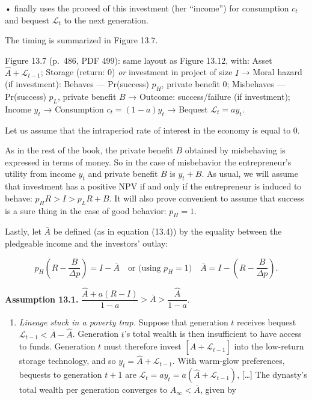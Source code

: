 \documentclass[11pt,a4paper]{article}
\providecommand{\tightlist}{\setlength{\itemsep}{0pt}\setlength{\parskip}{0pt}}
\begin{document}
• finally uses the proceed of this investment (her ``income'') for consumption \(c_t\) and bequest
\(\mathcal{L}_t\) to the next generation.

The timing is summarized in Figure 13.7.

Figure 13.7 (p.~486, PDF 499): same layout as Figure 13.12, with: Asset
\(\hat A + \mathcal{L}_{t-1}\); Storage (return: 0) \emph{or} investment in project of size \(I\) →
Moral hazard (if investment): Behaves --- Pr(success) \(p_H\), private benefit 0; Misbehaves ---
Pr(success) \(p_L\), private benefit \(B\) → Outcome: success/failure (if investment); Income
\(y_t\) → Consumption \(c_t = (1 - a)y_t\) → Bequest \(\mathcal{L}_t = ay_t\).

Let us assume that the intraperiod rate of interest in the economy is equal to 0.

As in the rest of the book, the private benefit \(B\) obtained by misbehaving is expressed in terms
of money. So in the case of misbehavior the entrepreneur's utility from income \(y_t\) and private
benefit \(B\) is \(y_t + B\). As usual, we will assume that investment has a positive NPV if and
only if the entrepreneur is induced to behave: \(p_H R > I > p_L R + B\). It will also prove
convenient to assume that success is a sure thing in the case of good behavior: \(p_H = 1\).

Lastly, let \(\bar A\) be defined (as in equation (13.4)) by the equality between the pledgeable
income and the investors' outlay:

\[p_H\left(R - \frac{B}{\Delta p}\right) = I - \bar A \quad\text{or (using } p_H = 1\text{)}\quad \bar A = I - \left(R - \frac{B}{\Delta p}\right).\]

\textbf{Assumption 13.1.} \(\dfrac{\hat A + a(R - I)}{1 - a} > \bar A > \dfrac{\hat A}{1 - a}\).

\begin{enumerate}
\def\labelenumi{(\alph{enumi})}
\tightlist
\item
  \emph{Lineage stuck in a poverty trap.} Suppose that generation \(t\) receives bequest
  \(\mathcal{L}_{t-1} < \bar A - \hat A\). Generation \(t\)'s total wealth is then insufficient to
  have access to funds. Generation \(t\) must therefore invest \([\hat A + \mathcal{L}_{t-1}]\) into
  the low-return storage technology, and so \(y_t = \hat A + \mathcal{L}_{t-1}\). With warm-glow
  preferences, bequests to generation \(t + 1\) are
  \(\mathcal{L}_t = ay_t = a(\hat A + \mathcal{L}_{t-1})\), {[}\ldots{]} The dynasty's total wealth
  per generation converges to \(A_\infty < \bar A\), given by
\end{enumerate}
\end{document}

